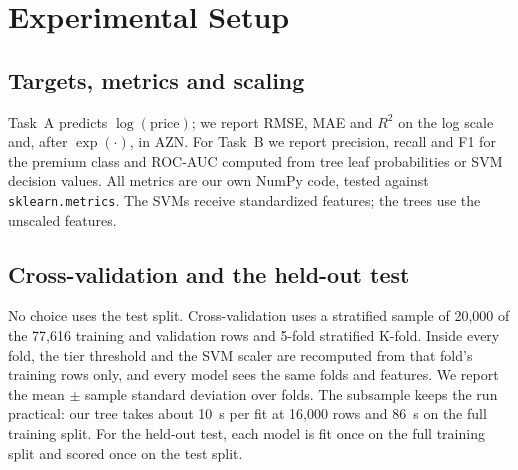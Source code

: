 \documentclass[10pt,twocolumn,a4paper]{article}
\begin{document}
\section{Experimental Setup}
\label{sec:setup}

\subsection{Targets, metrics and scaling}
Task~A predicts $\log(\text{price})$; we report RMSE, MAE and $R^2$ on
the log scale and, after $\exp(\cdot)$, in AZN. For Task~B we report
precision, recall and F1 for the premium class and ROC-AUC computed from
tree leaf probabilities or SVM decision values. All metrics are our own
NumPy code, tested against \texttt{sklearn.metrics}. %
The SVMs receive standardized features; the trees use the unscaled
features. %

\subsection{Cross-validation and the held-out test}
No choice uses the test split. Cross-validation uses a stratified sample
of 20{,}000 %
of the 77{,}616 training and validation rows %
and 5-fold stratified K-fold. %
Inside every fold, the tier threshold and the SVM scaler are recomputed
from that fold's training rows only, and every model sees the same folds
and features. We report the mean $\pm$ sample standard deviation over
folds. The subsample keeps the run practical: our tree takes about 10~s
per fit at 16{,}000 rows %
and 86~s on the full training split. %
For the held-out test, each model is fit once on the full training split
and scored once on the test split.
\end{document}
